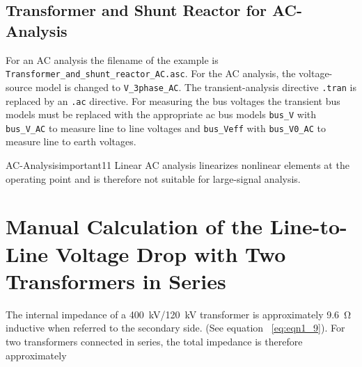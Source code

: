 \subsection{Transformer and Shunt Reactor for AC-Analysis}
\noindent For an AC analysis the filename of the example is \texttt{Transformer\_and\_shunt\_reactor\_AC.asc}.
For the AC analysis, the voltage-source model is changed to \texttt{V\_3phase\_AC}. The transient-analysis directive \texttt{.tran} is replaced by an \texttt{.ac} directive. For measuring the bus voltages
the transient bus models must be replaced with the appropriate ac bus models \texttt{bus\_V} with \texttt{bus\_V\_AC} to measure line to line voltages and \texttt{bus\_Veff} with \texttt{bus\_V0\_AC} to measure line to earth voltages.

\begin{important}{AC-Analysis}{important11}
	Linear AC analysis linearizes nonlinear elements at the operating point and is therefore not suitable for large-signal analysis.
\end{important}






\section{Manual Calculation of the Line-to-Line Voltage Drop with Two Transformers in Series}
\label{sec:manual-calculation-series-case}

	The internal impedance of a \SI{400}{\kilo\volt}/\SI{120}{\kilo\volt} transformer is approximately \SI{9.6}{\ohm} inductive when referred to the secondary side. (See equation ~\ref{eq:eqn1_9}). For two transformers connected in series, the total impedance is therefore approximately

